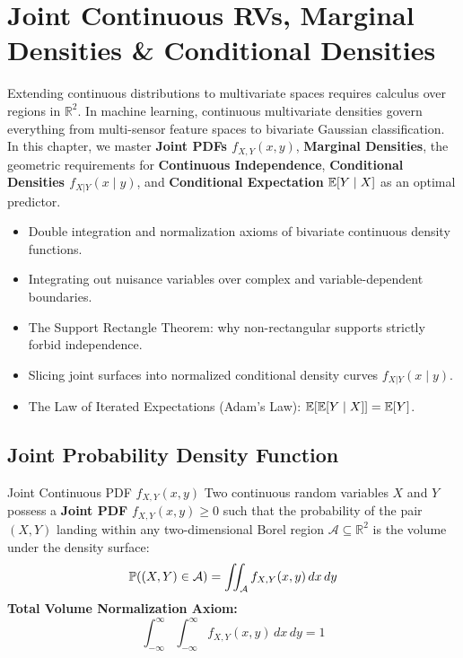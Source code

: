 \chapter{Joint Continuous RVs, Marginal Densities \& Conditional Densities}

Extending continuous distributions to multivariate spaces requires calculus over regions in $\mathbb{R}^2$. In machine learning, continuous multivariate densities govern everything from multi-sensor feature spaces to bivariate Gaussian classification. In this chapter, we master \textbf{Joint PDFs $f_{X,Y}(x, y)$}, \textbf{Marginal Densities}, the geometric requirements for \textbf{Continuous Independence}, \textbf{Conditional Densities $f_{X|Y}(x \mid y)$}, and \textbf{Conditional Expectation} $\E[Y \mid X]$ as an optimal predictor.

\vspace{0.5cm}
\begin{tcolorbox}[colback=primarylight, colframe=primarydark, title={\textbf{What You'll Learn in this Chapter}}]
\begin{itemize}
    \item Double integration and normalization axioms of bivariate continuous density functions.
    \item Integrating out nuisance variables over complex and variable-dependent boundaries.
    \item The Support Rectangle Theorem: why non-rectangular supports strictly forbid independence.
    \item Slicing joint surfaces into normalized conditional density curves $f_{X|Y}(x \mid y)$.
    \item The Law of Iterated Expectations (Adam's Law): $\E[\E[Y \mid X]] = \E[Y]$.
\end{itemize}
\end{tcolorbox}

\section{Joint Probability Density Function}

\begin{definitionbox}{Joint Continuous PDF $f_{X,Y}(x, y)$}
Two continuous random variables $X$ and $Y$ possess a \textbf{Joint PDF} $f_{X,Y}(x, y) \ge 0$ such that the probability of the pair $(X, Y)$ landing within any two-dimensional Borel region $\mathcal{A} \subseteq \mathbb{R}^2$ is the volume under the density surface:
$$\P((X, Y) \in \mathcal{A}) = \iint_{\mathcal{A}} f_{X,Y}(x, y) \, dx \, dy$$
\textbf{Total Volume Normalization Axiom:}
$$\int_{-\infty}^{\infty} \int_{-\infty}^{\infty} f_{X,Y}(x, y) \, dx \, dy = 1$$
\end{definitionbox}

